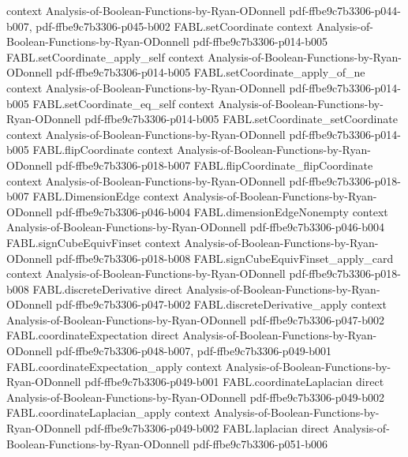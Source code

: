 \begin{theorem}
  {context}
  {Analysis-of-Boolean-Functions-by-Ryan-ODonnell}
  {pdf-ffbe9c7b3306-p044-b007,
    pdf-ffbe9c7b3306-p045-b002}
\proofstep
  {FABL.setCoordinate}
  {context}
  {Analysis-of-Boolean-Functions-by-Ryan-ODonnell}
  {pdf-ffbe9c7b3306-p014-b005}
\proofstep
  {FABL.setCoordinate_apply_self}
  {context}
  {Analysis-of-Boolean-Functions-by-Ryan-ODonnell}
  {pdf-ffbe9c7b3306-p014-b005}
\proofstep
  {FABL.setCoordinate_apply_of_ne}
  {context}
  {Analysis-of-Boolean-Functions-by-Ryan-ODonnell}
  {pdf-ffbe9c7b3306-p014-b005}
\proofstep
  {FABL.setCoordinate_eq_self}
  {context}
  {Analysis-of-Boolean-Functions-by-Ryan-ODonnell}
  {pdf-ffbe9c7b3306-p014-b005}
\proofstep
  {FABL.setCoordinate_setCoordinate}
  {context}
  {Analysis-of-Boolean-Functions-by-Ryan-ODonnell}
  {pdf-ffbe9c7b3306-p014-b005}
\proofstep
  {FABL.flipCoordinate}
  {context}
  {Analysis-of-Boolean-Functions-by-Ryan-ODonnell}
  {pdf-ffbe9c7b3306-p018-b007}
\proofstep
  {FABL.flipCoordinate_flipCoordinate}
  {context}
  {Analysis-of-Boolean-Functions-by-Ryan-ODonnell}
  {pdf-ffbe9c7b3306-p018-b007}
\proofstep
  {FABL.DimensionEdge}
  {context}
  {Analysis-of-Boolean-Functions-by-Ryan-ODonnell}
  {pdf-ffbe9c7b3306-p046-b004}
\proofstep
  {FABL.dimensionEdgeNonempty}
  {context}
  {Analysis-of-Boolean-Functions-by-Ryan-ODonnell}
  {pdf-ffbe9c7b3306-p046-b004}
\proofstep
  {FABL.signCubeEquivFinset}
  {context}
  {Analysis-of-Boolean-Functions-by-Ryan-ODonnell}
  {pdf-ffbe9c7b3306-p018-b008}
\proofstep
  {FABL.signCubeEquivFinset_apply_card}
  {context}
  {Analysis-of-Boolean-Functions-by-Ryan-ODonnell}
  {pdf-ffbe9c7b3306-p018-b008}
\proofstep
  {FABL.discreteDerivative}
  {direct}
  {Analysis-of-Boolean-Functions-by-Ryan-ODonnell}
  {pdf-ffbe9c7b3306-p047-b002}
\proofstep
  {FABL.discreteDerivative_apply}
  {context}
  {Analysis-of-Boolean-Functions-by-Ryan-ODonnell}
  {pdf-ffbe9c7b3306-p047-b002}
\proofstep
  {FABL.coordinateExpectation}
  {direct}
  {Analysis-of-Boolean-Functions-by-Ryan-ODonnell}
  {pdf-ffbe9c7b3306-p048-b007,
    pdf-ffbe9c7b3306-p049-b001}
\proofstep
  {FABL.coordinateExpectation_apply}
  {context}
  {Analysis-of-Boolean-Functions-by-Ryan-ODonnell}
  {pdf-ffbe9c7b3306-p049-b001}
\proofstep
  {FABL.coordinateLaplacian}
  {direct}
  {Analysis-of-Boolean-Functions-by-Ryan-ODonnell}
  {pdf-ffbe9c7b3306-p049-b002}
\proofstep
  {FABL.coordinateLaplacian_apply}
  {context}
  {Analysis-of-Boolean-Functions-by-Ryan-ODonnell}
  {pdf-ffbe9c7b3306-p049-b002}
\proofstep
  {FABL.laplacian}
  {direct}
  {Analysis-of-Boolean-Functions-by-Ryan-ODonnell}
  {pdf-ffbe9c7b3306-p051-b006}

\end{theorem}
